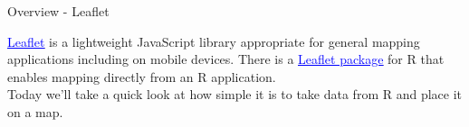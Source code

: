 \documentclass{beamer}
\begin{document}
\begin{frame}{
	\begin{minipage}[t]{0.75\textwidth}
		Overview - Leaflet
	\end{minipage}
	\hfill
	\begin{minipage}[t]{0.25\textwidth}
		\flushright
	\end{minipage}
}{}
\href{http://leafletjs.com}{\textcolor{blue}{\underline{Leaflet}}} is a lightweight JavaScript library appropriate for general mapping applications including on mobile devices. There is a \href{https://cran.r-project.org/web/packages/leaflet/leaflet.pdf}{\textcolor{blue}{\underline{Leaflet package}}} for R that enables mapping directly from an R application.\\
\vspace{0.5cm}
Today we'll take a quick look at how simple it is to take data from R and place it on a map.

\end{frame}
\end{document}
